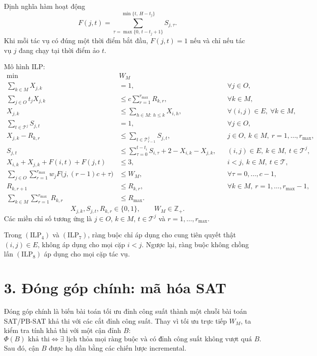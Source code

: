 \documentclass[12pt]{article}
\begin{document}
Định nghĩa hàm hoạt động
\[
F(j,t)=
\sum_{\tau=\max\{0,\,t-t_j+1\}}^{\min\{t,\,H-t_j\}}
S_{j,\tau}.
\]
Khi mỗi tác vụ có đúng một thời điểm bắt đầu, $F(j,t)=1$ nếu và chỉ nếu tác vụ $j$ đang chạy tại thời điểm ảo $t$.

Mô hình ILP:
\begingroup
\small
\begin{align}
\min\;& W_M \tag{ILP\_1}\\
\sum_{k\in M}X_{j,k} &= 1,
&& \forall j\in O, \tag{ILP\_2}\\
\sum_{j\in O}t_jX_{j,k}
&\le c\sum_{r=1}^{r_{\max}}R_{k,r},
&& \forall k\in M, \tag{ILP\_3}\\
X_{j,k}
&\le \sum_{h\in M:\ h\le k}X_{i,h},
&& \forall (i,j)\in E,\ \forall k\in M, \tag{ILP\_4}\\
\sum_{t\in\mathcal{T}^{j}}S_{j,t} &= 1,
&& \forall j\in O, \tag{ILP\_5}\\
X_{j,k}-R_{k,r}
&\le \sum_{t\in \mathcal{T}^{j}_{r-1}} S_{j,t},
&& j\in O,\ k\in M,\ r=1,\ldots,r_{\max}, \tag{ILP\_6}\\
S_{j,t}
&\le \sum_{\tau=0}^{t-t_i}S_{i,\tau}
    +2-X_{i,k}-X_{j,k},
&& (i,j)\in E,\ k\in M,\ t\in\mathcal{T}^{j}, \tag{ILP\_7}\\
X_{i,k}+X_{j,k}+F(i,t)+F(j,t)
&\le 3,
&& i<j,\ k\in M,\ t\in\mathcal{T}, \tag{ILP\_8}\\
\sum_{j\in O}\sum_{r=1}^{r_{\max}}
w_jF\big(j,(r-1)c+\tau\big)
&\le W_M,
&& \forall \tau=0,\ldots,c-1, \tag{ILP\_9}\\
R_{k,r+1}&\le R_{k,r},
&& \forall k\in M,\ r=1,\ldots,r_{\max}-1, \tag{ILP\_10}\\
\sum_{k\in M}\sum_{r=1}^{r_{\max}}R_{k,r}
&\le R_{\max}. \tag{ILP\_11}
\end{align}
\endgroup
\[
X_{j,k},S_{j,t},R_{k,r}\in\{0,1\},\qquad W_M\in\mathbb{Z}_{+}.
\tag{ILP\_12}
\]
Các miền chỉ số tương ứng là $j\in O$, $k\in M$, $t\in\mathcal{T}^{j}$ và $r=1,\ldots,r_{\max}$.

Trong $(\mathrm{ILP}_{4})$ và $(\mathrm{ILP}_{7})$, ràng buộc chỉ áp dụng cho cung tiên quyết thật $(i,j)\in E$, không áp dụng cho mọi cặp $i<j$. Ngược lại, ràng buộc không chồng lấn $(\mathrm{ILP}_{8})$ áp dụng cho mọi cặp tác vụ.

\section*{3. Đóng góp chính: mã hóa SAT}

Đóng góp chính là biến bài toán tối ưu đỉnh công suất thành một chuỗi bài toán SAT/PB-SAT khả thi với các cắt đỉnh công suất. Thay vì tối ưu trực tiếp $W_M$, ta kiểm tra tính khả thi với một cận đỉnh $B$:
\[
\Phi(B)\text{ khả thi}
\Longleftrightarrow
\exists\text{ lịch thỏa mọi ràng buộc và có đỉnh công suất không vượt quá }B.
\]
Sau đó, cận $B$ được hạ dần bằng các chiến lược incremental.
\end{document}
